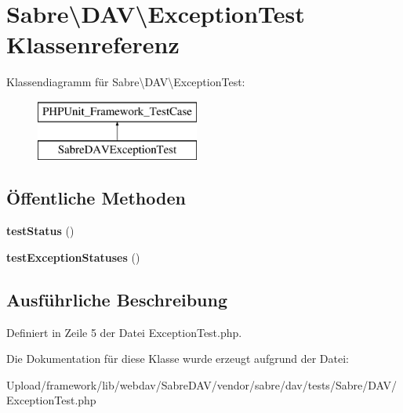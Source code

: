 \hypertarget{class_sabre_1_1_d_a_v_1_1_exception_test}{}\section{Sabre\textbackslash{}D\+AV\textbackslash{}Exception\+Test Klassenreferenz}
\label{class_sabre_1_1_d_a_v_1_1_exception_test}
Klassendiagramm für Sabre\textbackslash{}D\+AV\textbackslash{}Exception\+Test\+:\begin{figure}[H]
\begin{center}
\leavevmode
\includegraphics[height=2.000000cm]{class_sabre_1_1_d_a_v_1_1_exception_test}
\end{center}
\end{figure}
\subsection*{Öffentliche Methoden}
\begin{DoxyCompactItemize}
\item 
\mbox{\label{class_sabre_1_1_d_a_v_1_1_exception_test_a997ea5178c999c78cc4bb545e9c363c8}} 
{\bfseries test\+Status} ()
\item 
\mbox{\label{class_sabre_1_1_d_a_v_1_1_exception_test_a6cde3ecf37c8932422c744b210c0108d}} 
{\bfseries test\+Exception\+Statuses} ()
\end{DoxyCompactItemize}


\subsection{Ausführliche Beschreibung}


Definiert in Zeile 5 der Datei Exception\+Test.\+php.



Die Dokumentation für diese Klasse wurde erzeugt aufgrund der Datei\+:\begin{DoxyCompactItemize}
\item 
Upload/framework/lib/webdav/\+Sabre\+D\+A\+V/vendor/sabre/dav/tests/\+Sabre/\+D\+A\+V/Exception\+Test.\+php\end{DoxyCompactItemize}
